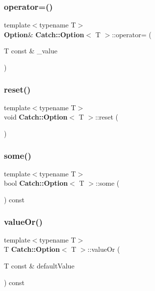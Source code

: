 \subsubsection{operator=()\hspace{0.1cm}{\footnotesize\ttfamily [2/2]}}
{\footnotesize\ttfamily template$<$typename T$>$ \\
\textbf{ Option}\& \textbf{ Catch\+::\+Option}$<$ T $>$\+::operator= (\begin{DoxyParamCaption}\item[{T const \&}]{\+\_\+value }\end{DoxyParamCaption})\hspace{0.3cm}{\ttfamily [inline]}}

\mbox{\label{class_catch_1_1_option_a37b4e0e5d4d56296adacd267a616f4e0}} 
\subsubsection{reset()}
{\footnotesize\ttfamily template$<$typename T$>$ \\
void \textbf{ Catch\+::\+Option}$<$ T $>$\+::reset (\begin{DoxyParamCaption}{ }\end{DoxyParamCaption})\hspace{0.3cm}{\ttfamily [inline]}}

\mbox{\label{class_catch_1_1_option_a97c95829afbe92f2bcc5fd75b32c0825}} 
\subsubsection{some()}
{\footnotesize\ttfamily template$<$typename T$>$ \\
bool \textbf{ Catch\+::\+Option}$<$ T $>$\+::some (\begin{DoxyParamCaption}{ }\end{DoxyParamCaption}) const\hspace{0.3cm}{\ttfamily [inline]}}

\mbox{\label{class_catch_1_1_option_a8d9ae2e30b0eb76fe134a6fbc8423124}} 
\subsubsection{value\+Or()}
{\footnotesize\ttfamily template$<$typename T$>$ \\
T \textbf{ Catch\+::\+Option}$<$ T $>$\+::value\+Or (\begin{DoxyParamCaption}\item[{T const \&}]{default\+Value }\end{DoxyParamCaption}) const\hspace{0.3cm}{\ttfamily [inline]}}



